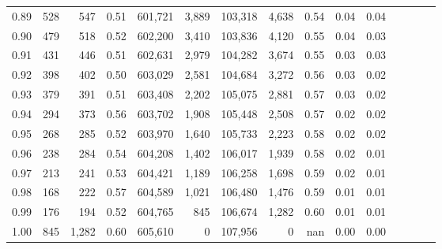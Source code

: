 \begin{tabular}{rrrcrrrrrrrrrrr}
0.89 &     528 &    547 &                                       0.51 &  601,721 &    3,889 &  103,318 &    4,638 &  0.54 &  0.04 &                         0.04 \\
0.90 &     479 &    518 &                                       0.52 &  602,200 &    3,410 &  103,836 &    4,120 &  0.55 &  0.04 &                         0.03 \\
0.91 &     431 &    446 &                                       0.51 &  602,631 &    2,979 &  104,282 &    3,674 &  0.55 &  0.03 &                         0.03 \\
0.92 &     398 &    402 &                                       0.50 &  603,029 &    2,581 &  104,684 &    3,272 &  0.56 &  0.03 &                         0.02 \\
0.93 &     379 &    391 &                                       0.51 &  603,408 &    2,202 &  105,075 &    2,881 &  0.57 &  0.03 &                         0.02 \\
0.94 &     294 &    373 &                                       0.56 &  603,702 &    1,908 &  105,448 &    2,508 &  0.57 &  0.02 &                         0.02 \\
0.95 &     268 &    285 &                                       0.52 &  603,970 &    1,640 &  105,733 &    2,223 &  0.58 &  0.02 &                         0.02 \\
0.96 &     238 &    284 &                                       0.54 &  604,208 &    1,402 &  106,017 &    1,939 &  0.58 &  0.02 &                         0.01 \\
0.97 &     213 &    241 &                                       0.53 &  604,421 &    1,189 &  106,258 &    1,698 &  0.59 &  0.02 &                         0.01 \\
0.98 &     168 &    222 &                                       0.57 &  604,589 &    1,021 &  106,480 &    1,476 &  0.59 &  0.01 &                         0.01 \\
0.99 &     176 &    194 &                                       0.52 &  604,765 &      845 &  106,674 &    1,282 &  0.60 &  0.01 &                         0.01 \\
1.00 &     845 &  1,282 &                                       0.60 &  605,610 &        0 &  107,956 &        0 &   nan &  0.00 &                         0.00 \\
\bottomrule
\end{tabular}
